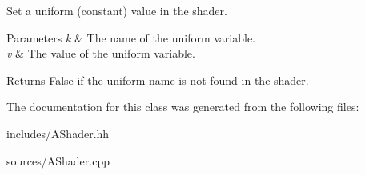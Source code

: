 Set a uniform (constant) value in the shader. 


\begin{DoxyParams}{Parameters}
{\em k} & The name of the uniform variable. \\
\hline
{\em v} & The value of the uniform variable. \\
\hline
\end{DoxyParams}
\begin{DoxyReturn}{Returns}
False if the uniform name is not found in the shader. 
\end{DoxyReturn}


The documentation for this class was generated from the following files\-:\begin{DoxyCompactItemize}
\item 
includes/A\-Shader.\-hh\item 
sources/A\-Shader.\-cpp\end{DoxyCompactItemize}
